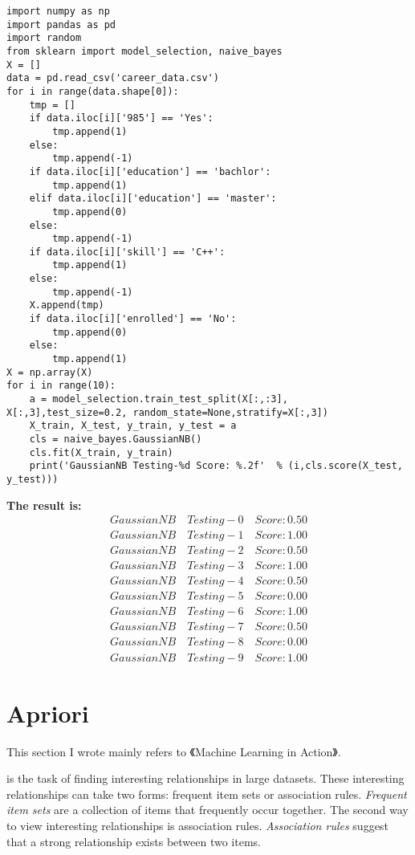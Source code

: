 \documentclass[letterpaper, 10 pt, conference]{ieeeconf}
\begin{document}
\begin{lstlisting}
import numpy as np
import pandas as pd
import random
from sklearn import model_selection, naive_bayes
X = []
data = pd.read_csv('career_data.csv')
for i in range(data.shape[0]):
    tmp = []
    if data.iloc[i]['985'] == 'Yes':
        tmp.append(1)
    else:
        tmp.append(-1)
    if data.iloc[i]['education'] == 'bachlor':
        tmp.append(1)
    elif data.iloc[i]['education'] == 'master':
        tmp.append(0)
    else:
        tmp.append(-1)
    if data.iloc[i]['skill'] == 'C++':
        tmp.append(1)
    else:
        tmp.append(-1)
    X.append(tmp)
    if data.iloc[i]['enrolled'] == 'No':
        tmp.append(0)
    else:
        tmp.append(1)
X = np.array(X)
for i in range(10):
    a = model_selection.train_test_split(X[:,:3], X[:,3],test_size=0.2, random_state=None,stratify=X[:,3])
    X_train, X_test, y_train, y_test = a
    cls = naive_bayes.GaussianNB()
    cls.fit(X_train, y_train)
    print('GaussianNB Testing-%d Score: %.2f'  % (i,cls.score(X_test, y_test)))
\end{lstlisting}

\textbf{The result is:}
\begin{align*}
GaussianNB \quad Testing-0 \quad Score: 0.50 \\
GaussianNB \quad Testing-1 \quad Score: 1.00 \\
GaussianNB \quad Testing-2 \quad Score: 0.50 \\
GaussianNB \quad Testing-3 \quad Score: 1.00 \\
GaussianNB \quad Testing-4 \quad Score: 0.50 \\
GaussianNB \quad Testing-5 \quad Score: 0.00 \\
GaussianNB \quad Testing-6 \quad Score: 1.00 \\
GaussianNB \quad Testing-7 \quad Score: 0.50 \\
GaussianNB \quad Testing-8 \quad Score: 0.00 \\
GaussianNB \quad Testing-9 \quad Score: 1.00
\end{align*}



\section{Apriori}

This section I wrote mainly refers to 《Machine Learning in Action》.

 is the task of finding interesting relationships in large datasets. These interesting relationships can take two forms: frequent item sets or association rules. \emph{Frequent item sets} are a collection of items that frequently occur together. The second way to view interesting relationships is association rules. \emph{Association rules} suggest that a strong relationship exists between two items. 
\end{document}

